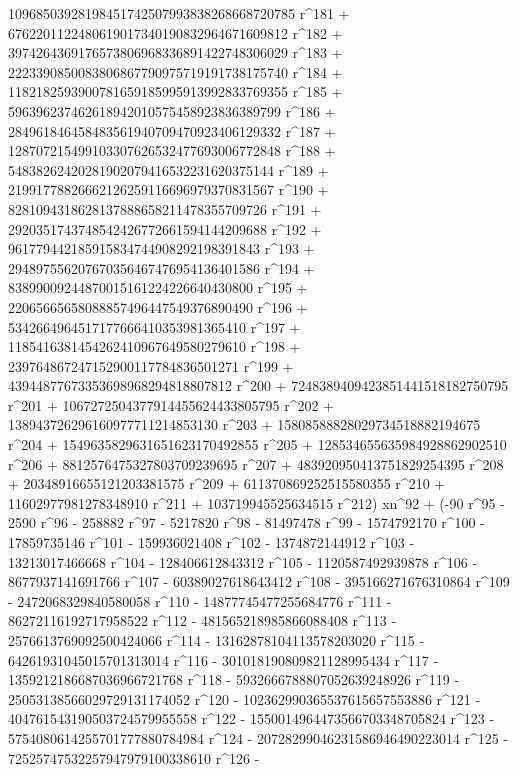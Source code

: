        10968503928198451742507993838268668720785 r^181 + 
       6762201122480619017340190832964671609812 r^182 + 
       3974264369176573806968336891422748306029 r^183 + 
       2223390850083806867790975719191738175740 r^184 + 
       1182182593900781659185995913992833769355 r^185 + 
       596396237462618942010575458923836389799 r^186 + 
       284961846458483561940709470923406129332 r^187 + 
       128707215499103307626532477693006772848 r^188 + 
       54838262420281902079416532231620375144 r^189 + 
       21991778826662126259116696979370831567 r^190 + 
       8281094318628137888658211478355709726 r^191 + 
       2920351743748542426772661594144209688 r^192 + 
       961779442185915834744908292198391843 r^193 + 
       294897556207670356467476954136401586 r^194 + 
       83899009244870015161224226640430800 r^195 + 
       22065665658088857496447549376890490 r^196 + 
       5342664964517177666410353981365410 r^197 + 
       1185416381454262410967649580279610 r^198 + 
       239764867247152900117784836501271 r^199 + 
       43944877673353698968294818807812 r^200 + 
       7248389409423851441518182750795 r^201 + 
       1067272504377914455624433805795 r^202 + 
       138943726296160977711214853130 r^203 + 
       15808588828029734518882194675 r^204 + 
       1549635829631651623170492855 r^205 + 
       128534655635984928862902510 r^206 + 
       8812576475327803709239695 r^207 + 
       483920950413751829254395 r^208 + 
       20348916655121203381575 r^209 + 611370869252515580355 r^210 + 
       11602977981278348910 r^211 + 
       103719945525634515 r^212) xn^92 + (-90 r^95 - 2590 r^96 - 
       258882 r^97 - 5217820 r^98 - 81497478 r^99 - 
       1574792170 r^100 - 17859735146 r^101 - 159936021408 r^102 - 
       1374872144912 r^103 - 13213017466668 r^104 - 
       128406612843312 r^105 - 1120587492939878 r^106 - 
       8677937141691766 r^107 - 60389027618643412 r^108 - 
       395166271676310864 r^109 - 2472068329840580058 r^110 - 
       14877745477255684776 r^111 - 86272116192717958522 r^112 - 
       481565218985866088408 r^113 - 2576613769092500424066 r^114 - 
       13162878104113578203020 r^115 - 
       64261931045015701313014 r^116 - 
       301018190809821128995434 r^117 - 
       1359212186687036966721768 r^118 - 
       5932666788807052639248926 r^119 - 
       25053138566029729131174052 r^120 - 
       102362990365537615657553886 r^121 - 
       404761543190503724579955558 r^122 - 
       1550014964473566703348705824 r^123 - 
       5754080614255701777880784984 r^124 - 
       20728299046231586946490223014 r^125 - 
       72525747532257947979100338610 r^126 - 
